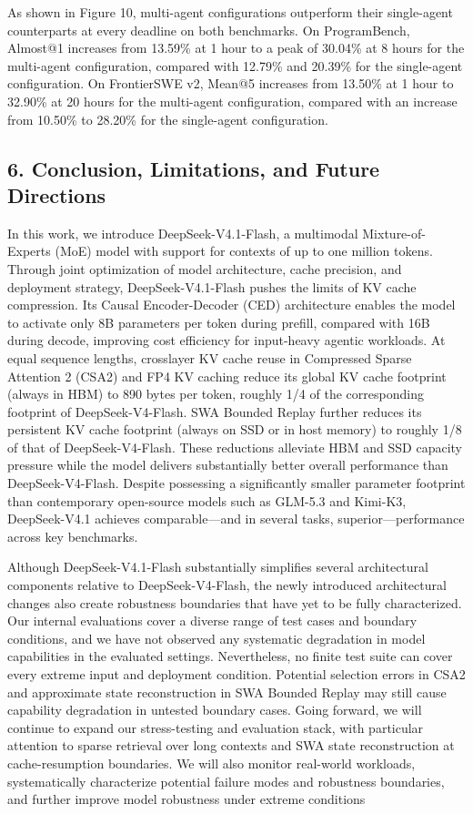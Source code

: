 \documentclass[
  10
]{article}
\begin{document}
As shown in Figure 10, multi-agent configurations outperform their
single-agent counterparts at every deadline on both benchmarks. On
ProgramBench, Almost@1 increases from 13.59\% at 1 hour to a peak of
30.04\% at 8 hours for the multi-agent configuration, compared with
12.79\% and 20.39\% for the single-agent configuration. On FrontierSWE
v2, Mean@5 increases from 13.50\% at 1 hour to 32.90\% at 20 hours for
the multi-agent configuration, compared with an increase from 10.50\% to
28.20\% for the single-agent configuration.

\subsection{6. Conclusion, Limitations, and Future
Directions}\label{conclusion-limitations-and-future-directions}

In this work, we introduce DeepSeek-V4.1-Flash, a multimodal
Mixture-of-Experts (MoE) model with support for contexts of up to one
million tokens. Through joint optimization of model architecture, cache
precision, and deployment strategy, DeepSeek-V4.1-Flash pushes the
limits of KV cache compression. Its Causal Encoder-Decoder (CED)
architecture enables the model to activate only 8B parameters per token
during prefill, compared with 16B during decode, improving cost
efficiency for input-heavy agentic workloads. At equal sequence lengths,
crosslayer KV cache reuse in Compressed Sparse Attention 2 (CSA2) and
FP4 KV caching reduce its global KV cache footprint (always in HBM) to
890 bytes per token, roughly 1/4 of the corresponding footprint of
DeepSeek-V4-Flash. SWA Bounded Replay further reduces its persistent KV
cache footprint (always on SSD or in host memory) to roughly 1/8 of that
of DeepSeek-V4-Flash. These reductions alleviate HBM and SSD capacity
pressure while the model delivers substantially better overall
performance than DeepSeek-V4-Flash. Despite possessing a significantly
smaller parameter footprint than contemporary open-source models such as
GLM-5.3 and Kimi-K3, DeepSeek-V4.1 achieves comparable---and in several
tasks, superior---performance across key benchmarks.

Although DeepSeek-V4.1-Flash substantially simplifies several
architectural components relative to DeepSeek-V4-Flash, the newly
introduced architectural changes also create robustness boundaries that
have yet to be fully characterized. Our internal evaluations cover a
diverse range of test cases and boundary conditions, and we have not
observed any systematic degradation in model capabilities in the
evaluated settings. Nevertheless, no finite test suite can cover every
extreme input and deployment condition. Potential selection errors in
CSA2 and approximate state reconstruction in SWA Bounded Replay may
still cause capability degradation in untested boundary cases. Going
forward, we will continue to expand our stress-testing and evaluation
stack, with particular attention to sparse retrieval over long contexts
and SWA state reconstruction at cache-resumption boundaries. We will
also monitor real-world workloads, systematically characterize potential
failure modes and robustness boundaries, and further improve model
robustness under extreme conditions
\end{document}
